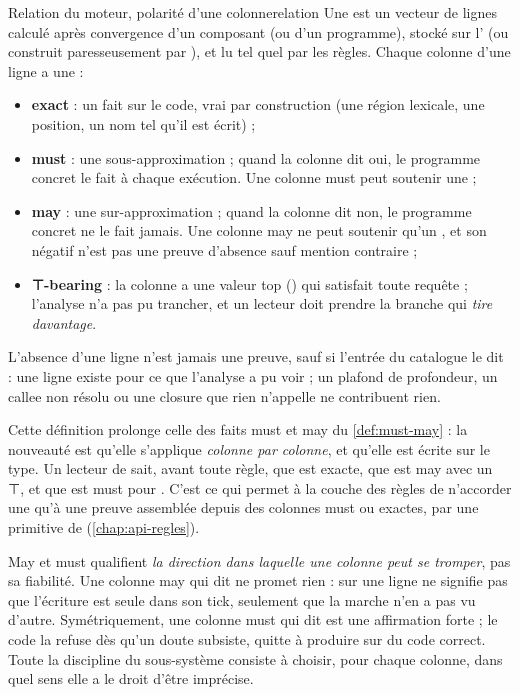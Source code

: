 \begin{definition}{Relation du moteur, polarité d'une colonne}{relation}
Une  est un vecteur de lignes calculé après convergence d'un composant (ou d'un programme), stocké sur l' (ou construit paresseusement par ), et lu tel quel par les règles. Chaque colonne d'une ligne a une  :
\begin{itemize}
  \item \textbf{exact} : un fait sur le code, vrai par construction (une région lexicale, une position, un nom tel qu'il est écrit) ;
  \item \textbf{must} : une sous-approximation ; quand la colonne dit oui, le programme concret le fait à chaque exécution. Une colonne must peut soutenir une \Error ;
  \item \textbf{may} : une sur-approximation ; quand la colonne dit non, le programme concret ne le fait jamais. Une colonne may ne peut soutenir qu'un \Warning, et son négatif n'est pas une preuve d'absence sauf mention contraire ;
  \item \textbf{⊤-bearing} : la colonne a une valeur top () qui satisfait toute requête ; l'analyse n'a pas pu trancher, et un lecteur doit prendre la branche qui \emph{tire davantage}.
\end{itemize}
L'absence d'une ligne n'est jamais une preuve, sauf si l'entrée du catalogue le dit : une ligne existe pour ce que l'analyse a pu voir ; un plafond de profondeur, un callee non résolu ou une closure que rien n'appelle ne contribuent rien.
\end{definition}

Cette définition prolonge celle des faits must et may du \cref{def:must-may} : la nouveauté est qu'elle s'applique \emph{colonne par colonne}, et qu'elle est écrite sur le type. Un lecteur de  sait, avant toute règle, que  est exacte, que  est may avec un ⊤, et que  est must pour . C'est ce qui permet à la couche des règles de n'accorder une \Error{} qu'à une preuve assemblée depuis des colonnes must ou exactes, par une primitive  de  (\cref{chap:api-regles}).

\begin{piege}
\og May\fg{} et \og must\fg{} qualifient \emph{la direction dans laquelle une colonne peut se tromper}, pas sa fiabilité. Une colonne may qui dit  ne promet rien :  sur une ligne ne signifie pas que l'écriture est seule dans son tick, seulement que la marche n'en a pas vu d'autre. Symétriquement, une colonne must qui dit  est une affirmation forte ; le code la refuse dès qu'un doute subsiste, quitte à produire  sur du code correct. Toute la discipline du sous-système consiste à choisir, pour chaque colonne, dans quel sens elle a le droit d'être imprécise.
\end{piege}

